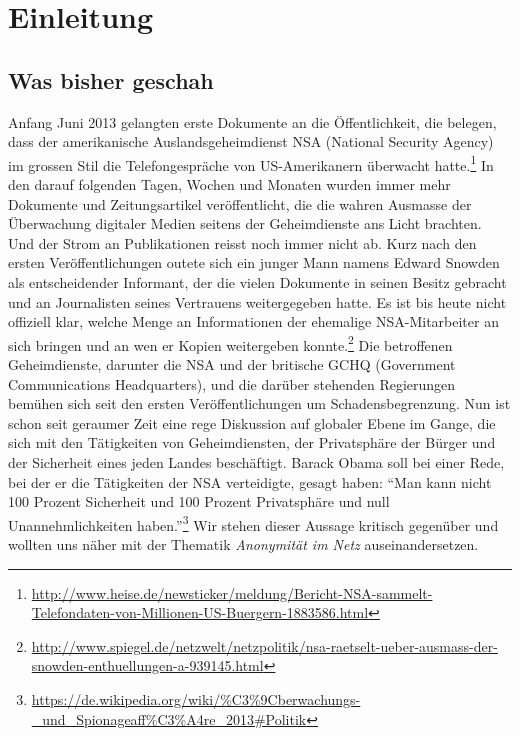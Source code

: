 \newpage
\section{Einleitung}

\subsection{Was bisher geschah}
Anfang Juni 2013 gelangten erste Dokumente an die Öffentlichkeit, die belegen, dass der amerikanische Auslandsgeheimdienst NSA (National Security Agency) im grossen Stil die Telefongespräche von US-Amerikanern überwacht hatte.\footnote{\url{http://www.heise.de/newsticker/meldung/Bericht-NSA-sammelt-Telefondaten-von-Millionen-US-Buergern-1883586.html}}
In den darauf folgenden Tagen, Wochen und Monaten wurden immer mehr Dokumente und Zeitungsartikel veröffentlicht, die die wahren Ausmasse der Überwachung digitaler Medien seitens der Geheimdienste ans Licht brachten. Und der Strom an Publikationen reisst noch immer nicht ab. Kurz nach den ersten Veröffentlichungen outete sich ein junger Mann namens Edward Snowden als entscheidender Informant, der die vielen Dokumente in seinen Besitz gebracht und an Journalisten seines Vertrauens weitergegeben hatte. Es ist bis heute nicht offiziell klar, welche Menge an Informationen der ehemalige NSA-Mitarbeiter an sich bringen und an wen er Kopien weitergeben konnte.\footnote{\url{http://www.spiegel.de/netzwelt/netzpolitik/nsa-raetselt-ueber-ausmass-der-snowden-enthuellungen-a-939145.html}}
Die betroffenen Geheimdienste, darunter die NSA und der britische GCHQ (Government Communications Headquarters), und die darüber stehenden Regierungen bemühen sich seit den ersten Veröffentlichungen um Schadensbegrenzung. Nun ist schon seit geraumer Zeit eine rege Diskussion auf globaler Ebene im Gange, die sich mit den Tätigkeiten von Geheimdiensten, der Privatsphäre der Bürger und der Sicherheit eines jeden Landes beschäftigt. Barack Obama soll bei einer Rede, bei der er die Tätigkeiten der NSA verteidigte, gesagt haben: ``Man kann nicht 100 Prozent Sicherheit und 100 Prozent Privatsphäre und null Unannehmlichkeiten haben.''\footnote{\url{https://de.wikipedia.org/wiki/\%C3\%9Cberwachungs-_und_Spionageaff\%C3\%A4re_2013\#Politik}}
Wir stehen dieser Aussage kritisch gegenüber und wollten uns näher mit der Thematik \textit{Anonymität im Netz} auseinandersetzen.

